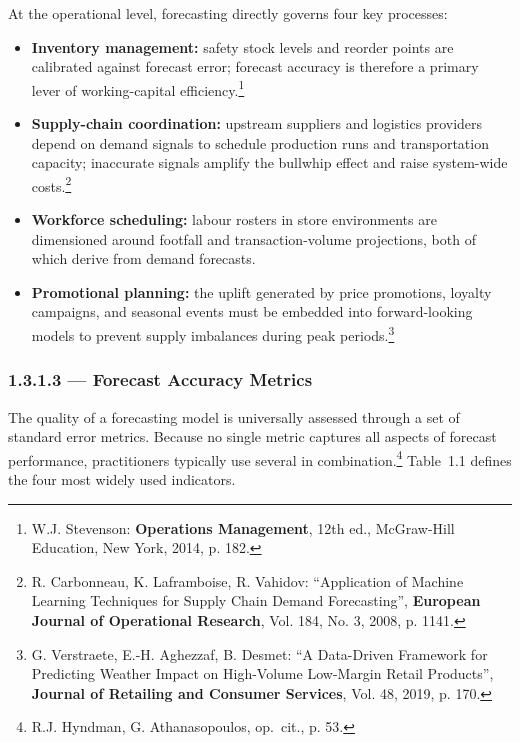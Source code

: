 At the operational level, forecasting directly governs four key processes:

\begin{itemize}
  \item \textbf{Inventory management:} safety stock levels and reorder
        points are calibrated against forecast error; forecast accuracy
        is therefore a primary lever of working-capital
        efficiency.\footnote{W.J. Stevenson: \textbf{Operations Management},
        12th ed., McGraw-Hill Education, New York, 2014, p. 182.}

  \item \textbf{Supply-chain coordination:} upstream suppliers and logistics
        providers depend on demand signals to schedule production runs and
        transportation capacity; inaccurate signals amplify the bullwhip
        effect and raise system-wide costs.\footnote{R. Carbonneau,
        K. Laframboise, R. Vahidov: ``Application of Machine Learning
        Techniques for Supply Chain Demand Forecasting'',
        \textbf{European Journal of Operational Research}, Vol. 184,
        No. 3, 2008, p. 1141.}

  \item \textbf{Workforce scheduling:} labour rosters in store environments
        are dimensioned around footfall and transaction-volume projections,
        both of which derive from demand forecasts.

  \item \textbf{Promotional planning:} the uplift generated by price
        promotions, loyalty campaigns, and seasonal events must be
        embedded into forward-looking models to prevent supply imbalances
        during peak periods.\footnote{G. Verstraete, E.-H. Aghezzaf,
        B. Desmet: ``A Data-Driven Framework for Predicting Weather
        Impact on High-Volume Low-Margin Retail Products'',
        \textbf{Journal of Retailing and Consumer Services}, Vol. 48,
        2019, p. 170.}
\end{itemize}

\subsubsection{1.3.1.3 — Forecast Accuracy Metrics}

The quality of a forecasting model is universally assessed through a set
of standard error metrics. Because no single metric captures all aspects
of forecast performance, practitioners typically use several in
combination.\footnote{R.J. Hyndman, G. Athanasopoulos, op.\ cit.,
p. 53.} Table~1.1 defines the four most widely used indicators.

